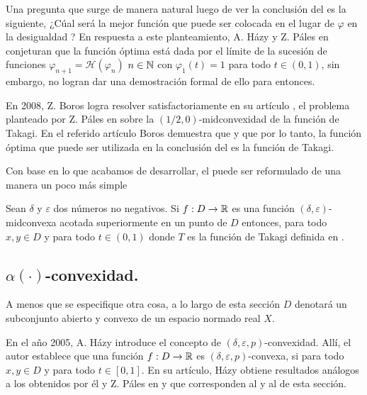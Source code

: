 Una pregunta que surge de manera natural luego de ver la conclusión
del  es la siguiente, ¿Cúal será la mejor función que
puede ser colocada en el lugar de $\varphi$ en la desigualdad
? En respuesta a este planteamiento, A. Házy y Z. Páles en \cite{HazPal04}
conjeturan que la función óptima está dada por el límite de la
sucesión de funciones $\varphi_{n+1}=\mathcal{H}(\varphi_{n})$
$n\in\mathbb{N}$ con $\varphi_1(t)=1$ para todo $t\in(0,1)$, sin embargo,
no logran dar una demostración formal de ello para entonces. 

En 2008, Z. Boros logra resolver satisfactoriamente en su artículo \cite{Bor08},
el problema planteado por Z. Páles en \cite{ISFE41} sobre la 
$(1/2,0)$-midconvexidad de la función de Takagi. En el referido artículo
Boros demuestra que  
y que por lo tanto, la función óptima que puede ser utilizada en la conclusión del
 es la función de Takagi. 

Con base en lo que acabamos de desarrollar, el 
puede ser reformulado de una manera un poco más simple
\begin{theorem}
\label{THazPal3}
Sean $\delta$ y $\varepsilon$ dos números no negativos. Si $f:D\to\mathbb{R}$ es una función
$(\delta,\varepsilon)$-midconvexa acotada superiormente en un punto de $D$ entonces,
para todo $x,y\in D$ y para todo $t\in(0,1)$
donde $T$ es la función de Takagi definida en .
\end{theorem}

\subsection{$\alpha(\cdot)$-convexidad.}

A menos que se especifique otra cosa, a lo largo de esta sección
$D$ denotará un subconjunto abierto y convexo de un espacio normado
real $X$.

En el año 2005, A. Házy \cite{Haz05a} introduce el concepto de $(\delta,\varepsilon,p)$-convexidad.
Allí, el autor establece que
una función $f:D\to\mathbb{R}$ es $(\delta,\varepsilon,p)$-convexa, si 
para todo $x,y\in D$ y para todo $t\in[0,1]$. En su artículo, Házy
obtiene resultados análogos a los obtenidos por él y Z. Páles
en \cite{HazPal04} y que corresponden al  y al 
de esta sección.

